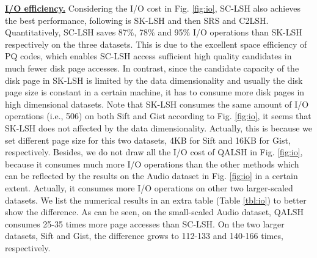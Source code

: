 \documentclass[twocolumn]{svjour3}          %
\newcommand{\btitle}[1]{\vspace{1ex}\noindent\underline{\textbf{#1}}}
\begin{document}
\noindent\btitle{I/O efficiency.} Considering the I/O cost in Fig. \ref{fig:io}, SC-LSH also achieves the best performance, following is SK-LSH and then SRS and C2LSH. Quantitatively, SC-LSH saves 87\%, 78\% and 95\% I/O operations than SK-LSH respectively on the three datasets. 
This is due to the excellent space efficiency of PQ codes, which enables SC-LSH access sufficient high quality candidates in much fewer disk page accesses.
In contrast, since the candidate capacity of the disk page in SK-LSH is limited by the data dimensionality and usually the disk page size is constant in a certain machine, it has to consume more disk pages in high dimensional datasets. Note that SK-LSH consumes the same amount of I/O operations (i.e., 506) on both Sift and Gist according to Fig. \ref{fig:io}, it seems that SK-LSH does not affected by the data dimensionality. Actually, this is because we set different page size for this two datasets, 4KB for Sift and 16KB for Gist, respectively.
Besides, we do not draw all the I/O cost of QALSH in Fig. \ref{fig:io}, because it consumes much more I/O operations than the other methods which can be reflected by the results on the Audio dataset in Fig. \ref{fig:io} in a certain extent. Actually, it consumes more I/O operations on other two larger-scaled datasets. We list the numerical results in an extra table (Table \ref{tbl:io}) to better show the difference. As can be seen, on the small-scaled Audio dataset, QALSH consumes 25-35 times more page accesses than SC-LSH. On the two larger datasets, Sift and Gist, the difference grows to 112-133 and 140-166 times, respectively.
\end{document}
